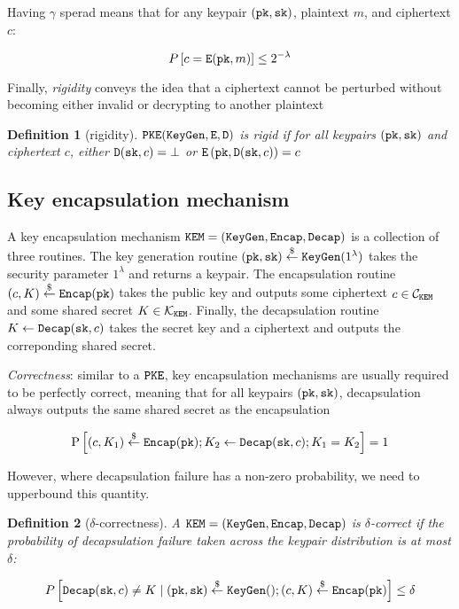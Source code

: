 \documentclass{article}
\newtheorem{definition}{Definition}[section]
\begin{document}
Having $\gamma$ sperad means that for any keypair $(\texttt{pk}, \texttt{sk})$, plaintext $m$, and ciphertext $c$:

$$
P\left\lbrack c = \texttt{E}(\texttt{pk}, m) \right\rbrack \leq 2^{-\lambda}
$$

Finally, \emph{rigidity} conveys the idea that a ciphertext cannot be perturbed without becoming either invalid or decrypting to another plaintext

\begin{definition}[rigidity]\label{def:rigidity}
    $\texttt{PKE}(\texttt{KeyGen}, \texttt{E}, \texttt{D})$ is \emph{rigid} if for all keypairs $(\texttt{pk}, \texttt{sk})$ and ciphertext $c$, either $\texttt{D}(\texttt{sk}, c) = \bot$ or $\texttt{E}\left(\texttt{pk}, \texttt{D}(\texttt{sk}, c)\right) = c$
\end{definition}

\subsection{Key encapsulation mechanism}
A key encapsulation mechanism $\texttt{KEM} = (\texttt{KeyGen}, \texttt{Encap}, \texttt{Decap})$ is a collection of three routines. The key generation routine $(\texttt{pk}, \texttt{sk}) \stackrel{\$}{\leftarrow} \texttt{KeyGen}(1^\lambda)$ takes the security parameter $1^\lambda$ and returns a keypair. The encapsulation routine $(c, K) \stackrel{\$}{\leftarrow} \texttt{Encap}(\texttt{pk})$ takes the public key and outputs some ciphertext $c \in \mathcal{C}_\texttt{KEM}$ and some shared secret $K \in \mathcal{K}_\texttt{KEM}$. Finally, the decapsulation routine $K \leftarrow \texttt{Decap}(\texttt{sk}, c)$ takes the secret key and a ciphertext and outputs the correponding shared secret.

\emph{Correctness}: similar to a $\texttt{PKE}$, key encapsulation mechanisms are usually required to be perfectly correct, meaning that for all keypairs $(\texttt{pk}, \texttt{sk})$, decapsulation always outputs the same shared secret as the encapsulation

\begin{equation*}
    \operatorname{P}\left\lbrack{(c, K_1) \stackrel{\$}{\leftarrow}\texttt{Encap}(\texttt{pk}); K_2 \leftarrow \texttt{Decap}(\texttt{sk}, c); K_1 = K_2}\right\rbrack = 1
\end{equation*}

However, where decapsulation failure has a non-zero probability, we need to upperbound this quantity.

\begin{definition}[$\delta$-correctness]\label{def:delta-correctness-kem}
    A $\texttt{KEM} = (\texttt{KeyGen}, \texttt{Encap}, \texttt{Decap})$ is $\delta$-correct if the probability of decapsulation failure taken across the keypair distribution is at most $\delta$:

    \begin{equation*}
        P\left\lbrack{
            \texttt{Decap}(\texttt{sk}, c) \neq K 
            \mid (\texttt{pk}, \texttt{sk}) \stackrel{\$}{\leftarrow}\texttt{KeyGen}()
                ; (c, K) \stackrel{\$}{\leftarrow}\texttt{Encap}(\texttt{pk})
        }\right\rbrack \leq \delta
    \end{equation*}
\end{definition}
\end{document}
